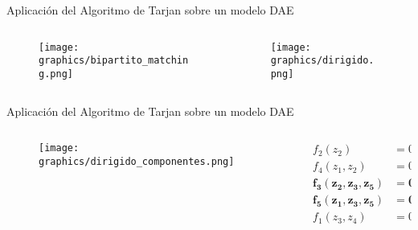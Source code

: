 \begin{frame}[fragile]{Aplicación del Algoritmo de Tarjan sobre un modelo DAE}
    \begin{columns}
        \begin{column}{0.5\textwidth}
        \begin{figure}
           \centering
           \texttt{[image: graphics/bipartito\_matching.png]}
        \end{figure}
        \end{column}
        \begin{column}{0.5\textwidth}
        \begin{figure}
           \centering
           \texttt{[image: graphics/dirigido.png]}
        \end{figure}
        \end{column}
    \end{columns}
\end{frame}

\begin{frame}[fragile]{Aplicación del Algoritmo de Tarjan sobre un modelo DAE}
    \begin{columns}
        \begin{column}{0.5\textwidth}
            \begin{figure}
               \centering
               \texttt{[image: graphics/dirigido\_componentes.png]}
            \end{figure}
        \end{column}  
        \begin{column}{0.5\textwidth}
            \begin{align*}
            f_2(z_2) &= 0 \\
            f_4(z_1,z_2) &= 0 \\
            \mathbf{f_3(z_2,z_3,z_5)} &= \mathbf{0} \\ 
            \mathbf{f_5(z_1,z_3,z_5)} &= \mathbf{0} \\
            f_1(z_3,z_4) &= 0 \\
            \end{align*}
        \end{column}
    \end{columns}
\end{frame}
